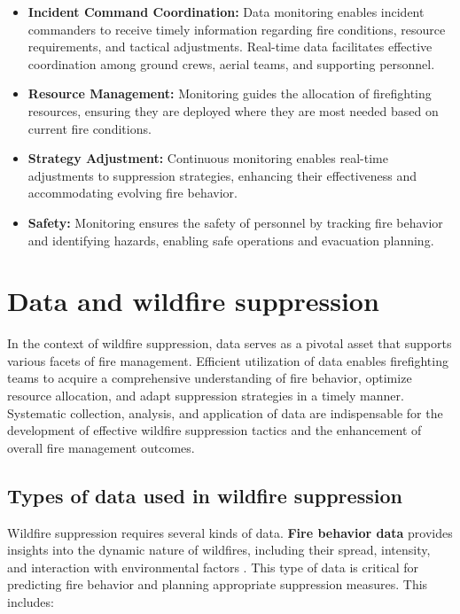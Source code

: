 \documentclass[
  12 pt,
]{Nemilov}
\begin{document}
\begin{itemize}
\item
  \textbf{Incident Command Coordination:} Data monitoring enables incident commanders to receive timely information regarding fire conditions, resource requirements, and tactical adjustments. Real-time data facilitates effective coordination among ground crews, aerial teams, and supporting personnel.
\item
  \textbf{Resource Management:} Monitoring guides the allocation of firefighting resources, ensuring they are deployed where they are most needed based on current fire conditions.
\item
  \textbf{Strategy Adjustment:} Continuous monitoring enables real-time adjustments to suppression strategies, enhancing their effectiveness and accommodating evolving fire behavior.
\item
  \textbf{Safety:} Monitoring ensures the safety of personnel by tracking fire behavior and identifying hazards, enabling safe operations and evacuation planning.
\end{itemize}

\section{Data and wildfire suppression}\label{data-and-wildfire-suppression}

In the context of wildfire suppression, data serves as a pivotal asset that supports various facets of fire management. Efficient utilization of data enables firefighting teams to acquire a comprehensive understanding of fire behavior, optimize resource allocation, and adapt suppression strategies in a timely manner. Systematic collection, analysis, and application of data are indispensable for the development of effective wildfire suppression tactics and the enhancement of overall fire management outcomes.

\subsection{Types of data used in wildfire suppression}\label{types-of-data-used-in-wildfire-suppression}

Wildfire suppression requires several kinds of data. \textbf{Fire behavior data} provides insights into the dynamic nature of wildfires, including their spread, intensity, and interaction with environmental factors \citep{albini1976computer, artes2019global, silva2022systematic}. This type of data is critical for predicting fire behavior and planning appropriate suppression measures. This includes:
\end{document}
